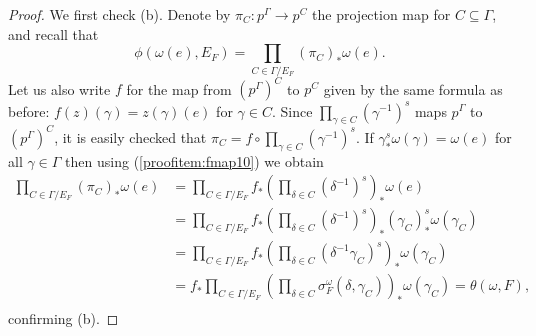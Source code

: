 \documentclass[10pt,a4paper]{amsart}
\begin{document}
\begin{proof}
	We first check (b). Denote by $\pi_C : p^\Gamma \rightarrow p^C$ the projection map for $C \subseteq \Gamma$, and recall that
	\[\phi(\omega(e), E_F) = \prod_{C \in \Gamma / E_F} (\pi_C)_* \omega(e).\]
	Let us also write $f$ for the map from $(p^\Gamma)^C$ to $p^C$ given by the same formula as before: $f(z)(\gamma) = z(\gamma)(e)$ for $\gamma \in C$. Since $\prod_{\gamma \in C} (\gamma^{-1})^s$ maps $p^\Gamma$ to $(p^\Gamma)^C$, it is easily checked that $\pi_C = f \circ \prod_{\gamma \in C} (\gamma^{-1})^s$. If $\gamma^s_* \omega(\gamma) = \omega(e)$ for all $\gamma \in \Gamma$ then using (\ref{proofitem:fmap10}) we obtain
	\begin{align*}
		\prod_{C \in \Gamma / E_F} (\pi_C)_* \omega(e) & = \prod_{C \in \Gamma / E_F} f_* \left( \prod_{\delta \in C} (\delta^{-1})^s \right)_* \omega(e)\\
		& = \prod_{C \in \Gamma / E_F} f_* \left( \prod_{\delta \in C} (\delta^{-1})^s \right)_* (\gamma_C)^s_* \omega(\gamma_C)\\
		& = \prod_{C \in \Gamma / E_F} f_* \left( \prod_{\delta \in C} (\delta^{-1} \gamma_C)^s \right)_* \omega(\gamma_C)\\
		& = f_* \prod_{C \in \Gamma / E_F} \left( \prod_{\delta \in C} \sigma^\omega_F(\delta, \gamma_C) \right)_* \omega(\gamma_C) = \theta(\omega, F),\\
	\end{align*}
	confirming (b).
	

\end{proof}
\end{document}
